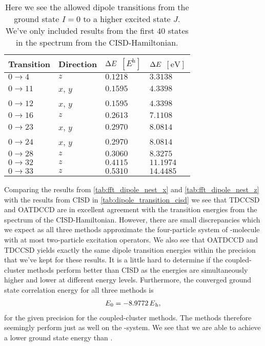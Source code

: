         \begin{table}
            \centering
            \caption{Here we see the allowed dipole transitions from the ground
            state $I = 0$ to a higher excited state $J$.
            We've only included results from the first $40$ states in the
            spectrum from the CISD-Hamiltonian.}
            \renewcommand{\arraystretch}{1.3}
            \begin{tabular}{@{}llll@{}}
                \toprule
                Transition & Direction
                &$\Delta E$ $[\si{\hartree}]$
                & $\Delta E$ $[\si{\electronvolt}]$ \\
                \midrule
                $0 \to 4$ & $z$ & $0.1218$ & $3.3138$ \\
                $0 \to 11$ & $x$, $y$ & $0.1595$ & $4.3398$ \\
                $0 \to 12$ & $x$, $y$ & $0.1595$ & $4.3398$ \\
                $0 \to 16$ & $z$ & $0.2613$ & $7.1108$ \\
                $0 \to 23$ & $x$, $y$ & $0.2970$ & $8.0814$ \\
                $0 \to 24$ & $x$, $y$ & $0.2970$ & $8.0814$ \\
                $0 \to 28$ & $z$ & $0.3060$ & $8.3275$ \\
                $0 \to 32$ & $z$ & $0.4115$ & $11.1974$ \\
                $0 \to 33$ & $z$ & $0.5310$ & $14.4485$ \\
                \bottomrule
            \end{tabular}
            \label{tab:dipole_transition_cisd}
        \end{table}
        Comparing the results from \autoref{tab:fft_dipole_nest_x} and
        \autoref{tab:fft_dipole_nest_z} with the results from CISD in
        \autoref{tab:dipole_transition_cisd} we see that TDCCSD and OATDCCD are
        in excellent agreement with the transition energies from the spectrum of
        the CISD-Hamiltonian.
        However, there are small discrepancies which we expect as all three
        methods approximate the four-particle system of -molecule with
        at most two-particle excitation operators.
        We also see that OATDCCD and TDCCSD yields exactly the same dipole
        transition energies within the precision that we've kept for these
        results.
        It is a little hard to determine if the coupled-cluster methods perform
        better than CISD as the energies are simultaneously higher and lower at
        different energy levels.
        Furthermore, the converged ground state correlation energy for all three
        methods is
        \begin{align}
            \energy_0 = \SI{-8.9772}{\hartree},
        \end{align}
        for the given precision for the coupled-cluster methods.
        The methods therefore seemingly perform just as well on the
        -system.
        We see that we are able to achieve a lower ground state energy than
        \citeauthor{nest}.

